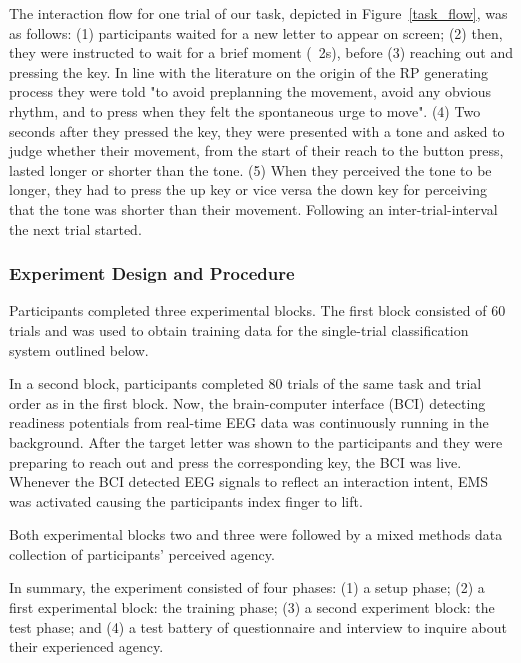 The interaction flow for one trial of our task, depicted in Figure~\ref{task_flow}, was as follows: (1) participants waited for a new letter to appear on screen; (2) then, they were instructed to wait for a brief moment (~2s), before (3) reaching out and pressing the key. In line with the literature on the origin of the RP generating process they were told "to avoid preplanning the movement, avoid any obvious rhythm, and to press when they felt the spontaneous urge to move". (4) Two  seconds after they pressed the key, they were presented with a tone and asked to judge whether their movement, from the start of their reach to the button press, lasted longer or shorter than the tone. (5) When they perceived the tone to be longer, they had to press the up key or vice versa the down key for perceiving that the tone was shorter than their movement. Following an inter-trial-interval the next trial started.

\subsubsection{Experiment Design and Procedure}
Participants completed three experimental blocks. The first block consisted of 60 trials and was used to obtain training data for the single-trial classification system outlined below. 


In a second block, participants completed 80 trials of the same task and trial order as in the first block. Now, the brain-computer interface (BCI) detecting readiness potentials from real-time EEG data was continuously running in the background. After the target letter was shown to the participants and they were preparing to reach out and press the corresponding key, the BCI was live. Whenever the BCI detected EEG signals to reflect an interaction intent, EMS was activated causing the participants index finger to lift. 

Both experimental blocks two and three were followed by a mixed methods data collection of participants' perceived agency.

In summary, the experiment consisted of four phases: (1) a setup phase; (2) a first experimental block: the training phase; (3) a second experiment block: the test phase; and (4) a test battery of questionnaire and interview to inquire about their experienced agency.

